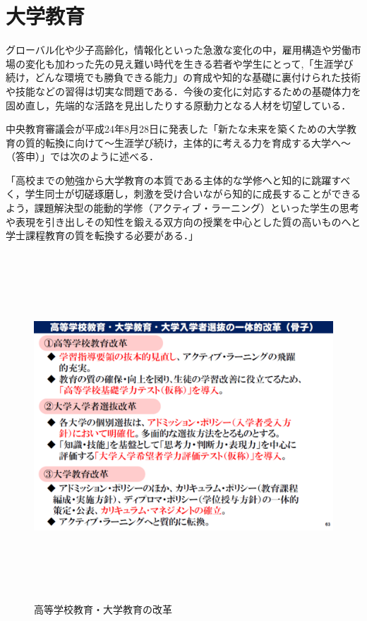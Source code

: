 \newpage

\section{大学教育}
グローバル化や少子高齢化，情報化といった急激な変化の中，雇用構造や労働市場の変化も加わった先の見え難い時代を生きる若者や学生にとって,「生涯学び続け，どんな環境でも勝負できる能力」の育成や知的な基礎に裏付けられた技術や技能などの習得は切実な問題である．今後の変化に対応するための基礎体力を固め直し，先端的な活路を見出したりする原動力となる人材を切望している．

中央教育審議会が平成24年8月28日に発表した「新たな未来を築くための大学教育の質的転換に向けて〜生涯学び続け，主体的に考える力を育成する大学へ〜（答申）」では次のように述べる\cite{中央教育審議会の定義}．

「高校までの勉強から大学教育の本質である主体的な学修へと知的に跳躍すべく，学生同士が切磋琢磨し，刺激を受け合いながら知的に成長することができるよう，課題解決型の能動的学修（アクティブ・ラーニング）といった学生の思考や表現を引き出しその知性を鍛える双方向の授業を中心とした質の高いものへと学士課程教育の質を転換する必要がある．」


\begin{figure}[h]
\centering
\includegraphics[height=13cm,width=13cm]{daigaku.pdf}
\caption{高等学校教育・大学教育の改革}\label{サンプル図}
\end{figure}

